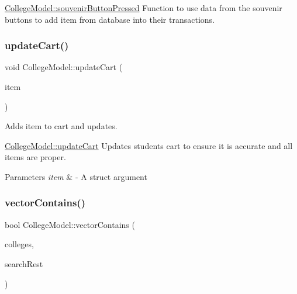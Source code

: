 \mbox{\hyperlink{class_college_model_a77fd4ae5151724440b68f236305ff74e}{College\+Model\+::souvenir\+Button\+Pressed}} Function to use data from the souvenir buttons to add item from database into their transactions. \mbox{\label{class_college_model_a6b2cca5127c7d95affe9870b1226a012}} 
\subsubsection{\texorpdfstring{update\+Cart()}{updateCart()}}
{\footnotesize\ttfamily void College\+Model\+::update\+Cart (\begin{DoxyParamCaption}\item[{\mbox{\hyperlink{structsouvenir_item}{souvenir\+Item}}}]{item }\end{DoxyParamCaption})}



Adds item to cart and updates. 

\mbox{\hyperlink{class_college_model_a6b2cca5127c7d95affe9870b1226a012}{College\+Model\+::update\+Cart}} Updates student\textquotesingle{}s cart to ensure it is accurate and all items are proper.


\begin{DoxyParams}{Parameters}
{\em item} & -\/ A struct argument \\
\hline
\end{DoxyParams}
\mbox{\label{class_college_model_a345c4e6868df90bed49e80b6783f5578}} 
\subsubsection{\texorpdfstring{vector\+Contains()}{vectorContains()}}
{\footnotesize\ttfamily bool College\+Model\+::vector\+Contains (\begin{DoxyParamCaption}\item[{Q\+Vector$<$ \mbox{\hyperlink{struct_college}{College}} $>$}]{colleges,  }\item[{\mbox{\hyperlink{struct_college}{College}}}]{search\+Rest }\end{DoxyParamCaption})}



